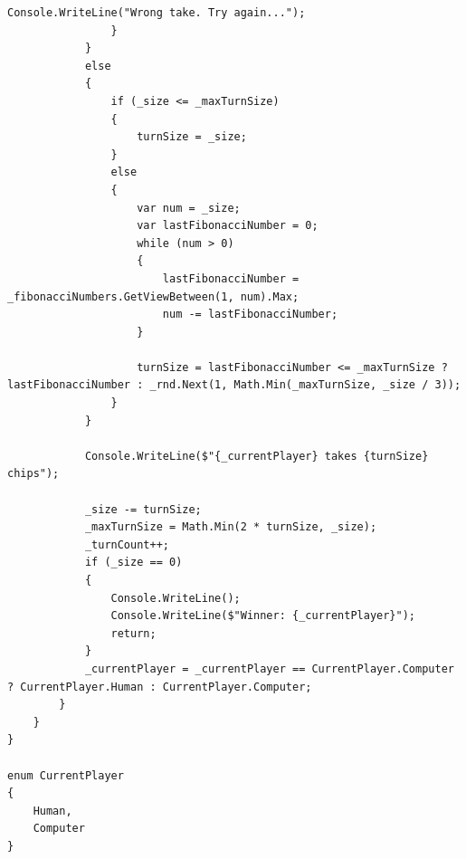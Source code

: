 \documentclass{article}
\begin{document}
\begin{lstlisting}[language={[Sharp]C}]
                    Console.WriteLine("Wrong take. Try again...");
                }
            }
            else
            {
                if (_size <= _maxTurnSize)
                {
                    turnSize = _size;
                }
                else
                {
                    var num = _size;
                    var lastFibonacciNumber = 0;
                    while (num > 0)
                    {
                        lastFibonacciNumber = _fibonacciNumbers.GetViewBetween(1, num).Max;
                        num -= lastFibonacciNumber;
                    }

                    turnSize = lastFibonacciNumber <= _maxTurnSize ? lastFibonacciNumber : _rnd.Next(1, Math.Min(_maxTurnSize, _size / 3));
                }
            }

            Console.WriteLine($"{_currentPlayer} takes {turnSize} chips");

            _size -= turnSize;
            _maxTurnSize = Math.Min(2 * turnSize, _size);
            _turnCount++;
            if (_size == 0)
            {
                Console.WriteLine();
                Console.WriteLine($"Winner: {_currentPlayer}");
                return;
            }
            _currentPlayer = _currentPlayer == CurrentPlayer.Computer ? CurrentPlayer.Human : CurrentPlayer.Computer;
        }
    }
}

enum CurrentPlayer
{
    Human,
    Computer
}
\end{lstlisting}
\end{document}
